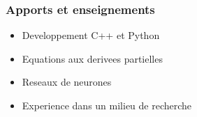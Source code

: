 \begin{frame}
    \frametitle{Apports et enseignements}
    \begin{itemize}
        \item Developpement C++ et Python   %
        \item Equations aux derivees partielles %
        \item Reseaux de neurones %
        \item Experience dans un milieu de recherche %
    \end{itemize}
\end{frame}


% 
